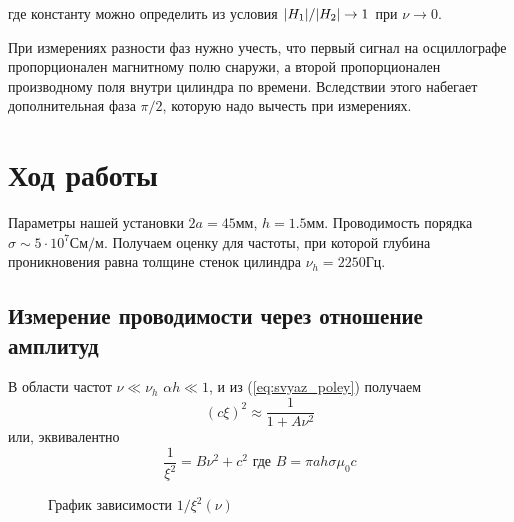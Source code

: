 \documentclass{article}
\begin{document}
где константу можно определить из условия $\abs{H_1}/\abs{H_2} \rightarrow 1$ при
$\nu \rightarrow 0$.

\vspace{0.3cm}

При измерениях разности фаз нужно учесть, что первый сигнал на осциллографе
пропорционален магнитному полю снаружи, а второй пропорционален производному
поля внутри цилиндра по времени. Вследствии этого набегает дополнительная фаза $\pi/2$,
которую надо вычесть при измерениях.

\newpage
\section{Ход работы}

Параметры нашей установки $2a = 45мм$, $h=1.5мм$. Проводимость порядка
$\sigma \sim 5\cdot 10^7 См/м$. Получаем оценку для частоты, при которой
глубина проникновения равна толщине стенок цилиндра $\nu_h = 2250 Гц$.

\subsection{Измерение проводимости через отношение амплитуд}
В области частот $\nu \ll \nu_h$ $\alpha h \ll 1$, и из (\ref{eq:svyaz_poley}) получаем
\begin{equation*}
    {(c\xi)}^2 \approx \frac{1}{1+A\nu^2}
\end{equation*}
или, эквивалентно
\begin{equation*}
    \frac{1}{\xi^2}=B\nu^2 + c^2 \text{ где } B=\pi a h \sigma \mu_0 c
    \label{eq:liniya_dlya_c}
\end{equation*}

\begin{figure}[h]
    \caption{График зависимости $1/\xi^2(\nu)$}\label{fig:xi_nu_low_freq_linearized}
    \newpage
\end{figure}
\end{document}
